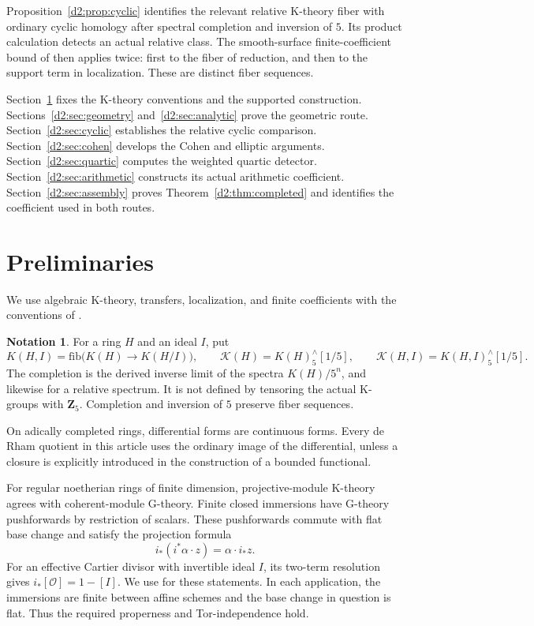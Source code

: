 \documentclass[11pt,a4paper]{amsart}
\numberwithin{equation}{section}
\theoremstyle{definition}
\newtheorem{notation}[theorem]{Notation}
\theoremstyle{remark}
\newcommand{\DtwoZZ}{\mathbf{Z}}
\newcommand{\DtwocO}{\mathcal O}
\newcommand{\DtwocK}{\mathcal K}
\newcommand{\Dtwofib}{\mathrm{fib}}
\begin{document}
Proposition~\ref{d2:prop:cyclic} identifies the relevant relative K-theory
fiber with ordinary cyclic homology after spectral completion and
inversion of \(5\). Its product calculation detects an actual relative
class. The smooth-surface finite-coefficient bound of
\cite[Theorem~8.4]{GeisserLevineCharP} then applies twice: first to the
fiber of reduction, and then to the support term in localization.
These are distinct fiber sequences.

Section~\ref{d2:sec:preliminaries} fixes the K-theory conventions and the
supported construction. Sections~\ref{d2:sec:geometry}
and~\ref{d2:sec:analytic} prove the geometric route.
Section~\ref{d2:sec:cyclic} establishes the relative cyclic comparison.
Section~\ref{d2:sec:cohen} develops the Cohen and elliptic arguments.
Section~\ref{d2:sec:quartic} computes the weighted quartic detector.
Section~\ref{d2:sec:arithmetic} constructs its actual arithmetic coefficient.
Section~\ref{d2:sec:assembly} proves Theorem~\ref{d2:thm:completed} and identifies
the coefficient used in both routes.

\section{Preliminaries}\label{d2:sec:preliminaries}

We use algebraic K-theory, transfers, localization, and finite
coefficients with the conventions of
\cite[Chapters~IV and~V]{Weibel}.

\begin{notation}\label{d2:notation:completion}
For a ring \(H\) and an ideal \(I\), put
\[
 K(H,I)=\Dtwofib\bigl(K(H)\longrightarrow K(H/I)\bigr),
 \qquad
 \DtwocK(H)=K(H)^\wedge_5[1/5],
 \qquad
 \DtwocK(H,I)=K(H,I)^\wedge_5[1/5].
\]
The completion is the derived inverse limit of the spectra
\(K(H)/5^n\), and likewise for a relative spectrum.
It is not defined by tensoring the actual K-groups with \(\DtwoZZ _5\).
Completion and inversion of \(5\) preserve fiber sequences.

On adically completed rings, differential forms are continuous forms.
Every de Rham quotient in this article uses the ordinary image of the
differential, unless a closure is explicitly introduced in the
construction of a bounded functional.
\end{notation}

For regular noetherian rings of finite dimension, projective-module
K-theory agrees with coherent-module G-theory. Finite closed immersions
have G-theory pushforwards by restriction of scalars. These pushforwards commute with flat base change and satisfy the projection formula
\[
 i_*(i^*\alpha\cdot z)=\alpha\cdot i_*z.
\]
For an effective Cartier divisor with invertible ideal \(I\), its
two-term resolution gives \(i_*[\DtwocO]=1-[I]\).
We use \cite[V.3.3, V.3.3.2, V.3.7.2, V.3.12]{Weibel}
for these statements. In each application, the immersions are finite
between affine schemes and the base change in question is flat.
Thus the required properness and Tor-independence hold.
\end{document}
